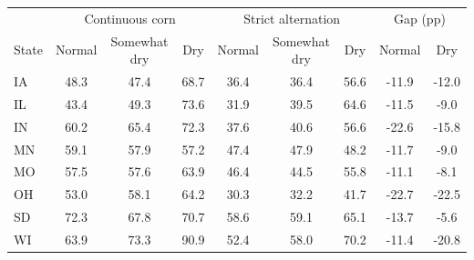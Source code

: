 \begin{tabular}{lcccccccc}
\toprule
& \multicolumn{3}{c}{Continuous corn} & \multicolumn{3}{c}{Strict alternation} & \multicolumn{2}{c}{Gap (pp)}\\
\cmidrule(lr){2-4}\cmidrule(lr){5-7}\cmidrule(lr){8-9}
State & Normal & Somewhat dry & Dry & Normal & Somewhat dry & Dry & Normal & Dry\\
\midrule
IA & 48.3 & 47.4 & 68.7 & 36.4 & 36.4 & 56.6 & -11.9 & -12.0 \\
IL & 43.4 & 49.3 & 73.6 & 31.9 & 39.5 & 64.6 & -11.5 & -9.0 \\
IN & 60.2 & 65.4 & 72.3 & 37.6 & 40.6 & 56.6 & -22.6 & -15.8 \\
MN & 59.1 & 57.9 & 57.2 & 47.4 & 47.9 & 48.2 & -11.7 & -9.0 \\
MO & 57.5 & 57.6 & 63.9 & 46.4 & 44.5 & 55.8 & -11.1 & -8.1 \\
OH & 53.0 & 58.1 & 64.2 & 30.3 & 32.2 & 41.7 & -22.7 & -22.5 \\
SD & 72.3 & 67.8 & 70.7 & 58.6 & 59.1 & 65.1 & -13.7 & -5.6 \\
WI & 63.9 & 73.3 & 90.9 & 52.4 & 58.0 & 70.2 & -11.4 & -20.8 \\
\bottomrule
\end{tabular}
